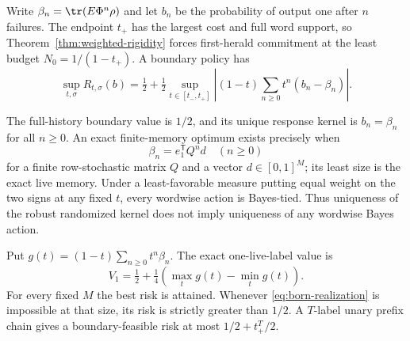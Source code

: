 Write $\beta_n=\tr(E\Phi^n\rho)$ and let $b_n$ be the probability of output one after $n$ failures. The endpoint $t_+$ has the largest cost and full word support, so Theorem~\ref{thm:weighted-rigidity} forces first-herald commitment at the least budget $N_0=1/(1-t_+)$. A boundary policy has
\begin{equation}\label{eq:analytic-calibration}
 \sup_{t,\sigma}R_{t,\sigma}(b)
 =\tfrac12+\tfrac12\sup_{t\in[t_-,t_+]}
       \left|(1-t)\sum_{n\ge0}t^n(b_n-\beta_n)\right|.
\end{equation}

\begin{theorem}\label{thm:calibration-realization}
The full-history boundary value is $1/2$, and its unique response kernel is $b_n=\beta_n$ for all $n\ge0$. An exact finite-memory optimum exists precisely when
\begin{equation}\label{eq:born-realization}
 \beta_n=e_1^{\mathsf T}Q^n d\quad(n\ge0)
\end{equation}
for a finite row-stochastic matrix $Q$ and a vector $d\in[0,1]^M$; its least size is the exact live memory. Under a least-favorable measure putting equal weight on the two signs at any fixed $t$, every wordwise action is Bayes-tied. Thus uniqueness of the robust randomized kernel does not imply uniqueness of any wordwise Bayes action.

Put $g(t)=(1-t)\sum_{n\ge0}t^n\beta_n$. The exact one-live-label value is
\begin{equation}\label{eq:calibration-one}
 V_1=\tfrac12+\tfrac14(\max_tg(t)-\min_tg(t)).
\end{equation}
For every fixed $M$ the best risk is attained. Whenever \eqref{eq:born-realization} is impossible at that size, its risk is strictly greater than $1/2$. A $T$-label unary prefix chain gives a boundary-feasible risk at most $1/2+t_+^T/2$.
\end{theorem}
